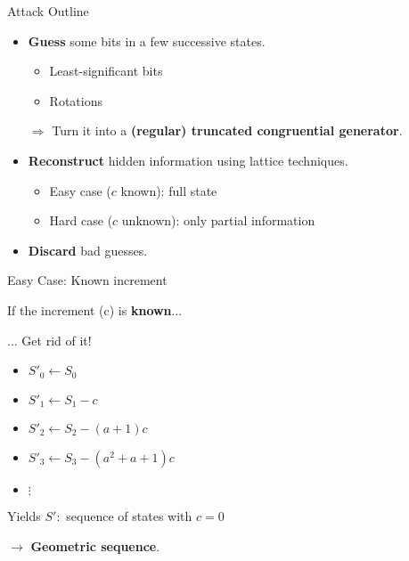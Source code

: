 \begin{frame}{Attack Outline}

\begin{itemize}
    \item \textbf{Guess} some bits in a few successive states.
    \begin{itemize}
          \item<2-> Least-significant bits
          \item<2-> Rotations
    \end{itemize}
      
    \medskip
      
    \item[$\Rightarrow$] Turn it into a \textbf{(regular) truncated congruential generator}.
      
    \medskip

    \item \textbf{Reconstruct} hidden information using lattice techniques.
    \begin{itemize}
          \item<3-> Easy case (\alert{$c$} known): full state
          \item<3-> Hard case (\alert{$c$} unknown): only partial information
      \end{itemize}
    
    \medskip
    
    \item \textbf{Discard} bad guesses.
\end{itemize}
\end{frame}



\begin{frame}{Easy Case: Known increment}

If the \alert{increment} (\alert{c}) is \textbf{known}...

\bigskip

\begin{exampleblock}{... Get rid of it!}
\begin{itemize}
    \item $S'_0 \gets S_0$
    \item $S'_1 \gets S_1 - c$
    \item $S'_2 \gets S_2 - (a+1)c$
    \item $S'_3 \gets S_3 - (a^2 + a + 1)c$
    \item $\vdots$
\end{itemize}
\end{exampleblock}

\bigskip

Yields $S' :$ sequence of states with $c=0$

$\rightarrow$ \textbf{Geometric sequence}.

\end{frame}



